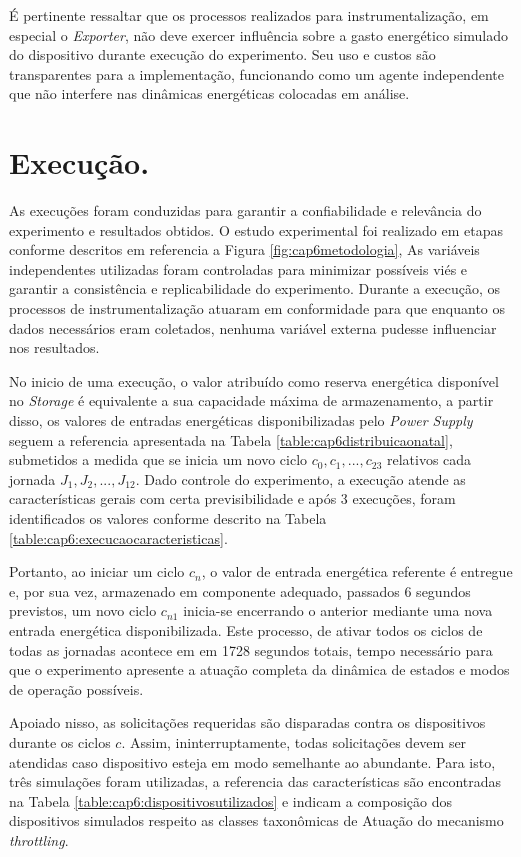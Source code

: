 É pertinente ressaltar que os processos realizados para instrumentalização, em especial o \textit{Exporter}, não deve exercer influência sobre a gasto energético simulado do dispositivo durante execução do experimento. Seu uso e custos são transparentes para a implementação, funcionando como um agente independente que não interfere nas dinâmicas energéticas colocadas em análise.

\section{Execução.}
\label{cap6:execucao}

As execuções foram conduzidas para garantir a confiabilidade e relevância do experimento e resultados obtidos. O estudo experimental foi realizado em etapas conforme descritos em referencia a Figura \ref{fig:cap6metodologia}, As variáveis independentes utilizadas foram controladas para minimizar possíveis viés e garantir a consistência e replicabilidade do experimento. Durante a execução, os processos de instrumentalização atuaram em conformidade para que enquanto os dados necessários eram coletados, nenhuma variável externa pudesse influenciar nos resultados.


No inicio de uma execução, o valor atribuído como reserva energética disponível no \textit{Storage} é equivalente a sua capacidade máxima de armazenamento, a partir disso, os valores de entradas energéticas disponibilizadas pelo \textit{Power Supply} seguem a referencia apresentada na Tabela \ref{table:cap6distribuicaonatal}, submetidos a medida que se inicia um novo ciclo $c_0, c_1,...,c_{23}$ relativos cada jornada $J_1, J_2, ..., J_{12}$. Dado controle do experimento, a execução atende as características gerais com certa previsibilidade e após 3 execuções, foram identificados os valores conforme descrito na Tabela \ref{table:cap6:execucaocaracteristicas}.


Portanto, ao iniciar um ciclo $c_n$, o valor de entrada energética referente é entregue e, por sua vez, armazenado em componente adequado, passados 6 segundos previstos, um novo ciclo $c_{n1}$ inicia-se encerrando o anterior mediante uma nova entrada energética disponibilizada. Este processo, de ativar todos os ciclos de todas as jornadas acontece em em 1728 segundos totais, tempo necessário para que o experimento apresente a atuação completa da dinâmica de estados e modos de operação possíveis.

Apoiado nisso, as solicitações requeridas são disparadas contra os dispositivos durante os ciclos $c$. Assim, ininterruptamente, todas solicitações devem ser atendidas caso dispositivo esteja em modo semelhante ao abundante. Para isto, três simulações foram utilizadas, a referencia das características são encontradas na Tabela \ref{table:cap6:dispositivosutilizados} e indicam a composição dos dispositivos simulados respeito as classes taxonômicas de Atuação do mecanismo \textit{throttling}. 


